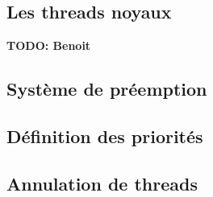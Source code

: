 \subsection{Les threads noyaux}

\textbf{TODO: Benoit}



\subsection{Système de préemption}



\subsection{Définition des priorités}


\subsection{Annulation de threads}


